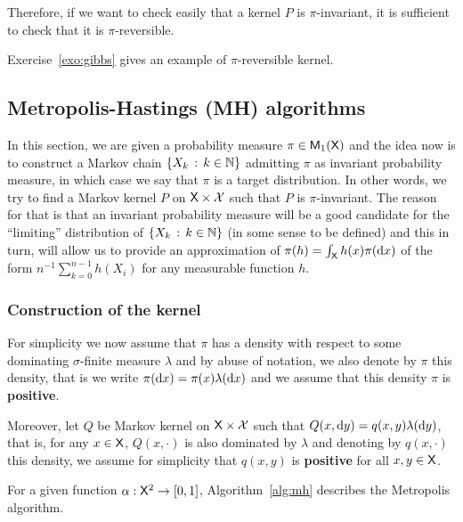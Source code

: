 \documentclass[english,graybox,envcountchap,envcountsame,sectrefs,shortlabels]{svmono}
\theoremstyle{style}
\begin{document}
Therefore, if we want to check easily that
a kernel $P$ is $\pi$-invariant, it is sufficient to check that
it is $\pi$-reversible.


Exercise~\ref{exo:gibbs} gives an example of $\pi$-reversible kernel.

\subsection{Metropolis-Hastings (MH) algorithms}
\label{sec:MH}
In this section, we are given a probability measure $\pi\in\mathsf{M}_{1}(\mathsf{X})$
and the idea now is to construct a Markov chain $\left\{ X_{k}\,:\,k\in\mathbb{N}\right\}$
admitting $\pi$ as invariant probability measure, in which case we
say that $\pi$ is a target distribution. In other words, we try to
find a Markov kernel $P$ on $\mathsf{X}\times\mathcal{X}$ such that $P$
is $\pi$-invariant. The reason for that is that an invariant probability
measure will be a good candidate for the ``limiting'' distribution
of $\left\{ X_{k}\,:\,k\in\mathbb{N}\right\}$ (in some sense to be defined) and this
in turn, will allow us to provide an approximation of $\pi(h)=\int_{\mathsf{X}}h(x)\pi(\mathrm{d} x)$ of the form $n^{-1}\sum_{k=0}^{n-1}h(X_{i})$ for any measurable function $h$. 


\subsubsection{Construction of the kernel\label{subsec:construc}}

For simplicity we now assume that $\pi$ has a density with respect
to some dominating $\sigma$-finite measure $\lambda$ and by abuse
of notation, we also denote by $\pi$ this density, that is we write
$\pi(\mathrm{d} x)=\pi(x)\lambda(\mathrm{d} x)$ and we assume that this density
$\pi$ is \textbf{positive}.

Moreover, let $Q$ be Markov kernel on $\mathsf{X}\times\mathcal{X}$ such
that $Q(x,\mathrm{d} y)=q(x,y)\lambda(\mathrm{d} y)$, that is, for any $x\in\mathsf{X}$,
$Q(x,\cdot)$ is also dominated by $\lambda$ and denoting by $q(x,\cdot)$
this density, we assume for simplicity that $q(x,y)$ is \textbf{positive}
for all $x,y\in\mathsf{X}$. 

For a given function $\alpha:\mathsf{X}^{2}\to[0,1]$,  Algorithm~\ref{alg:mh} describes the Metropolis algorithm.

%
\end{document}
